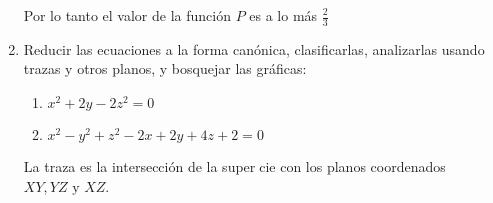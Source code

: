 \documentclass{article}
\begin{document}
\begin{enumerate}
{                Por lo tanto el valor de la función $P$ es a lo más $\frac{2}{3}$
            }
            \item {
                Reducir las ecuaciones a la forma canónica, clasificarlas, analizarlas
                usando trazas y otros planos, y bosquejar las gráficas:
                \begin{enumerate}
                    \item{
                        $x^2+2y-2z^2=0$
                    }
                    \item{
                        $x^2-y^2+z^2-2x+2y+4z+2=0$
                    }
                \end{enumerate}
                La traza es la intersección de la supercie con los planos coordenados
                $XY,YZ \text{ y } XZ$.

                \color{azul}
            }
        \end{enumerate}
    
\end{document}
